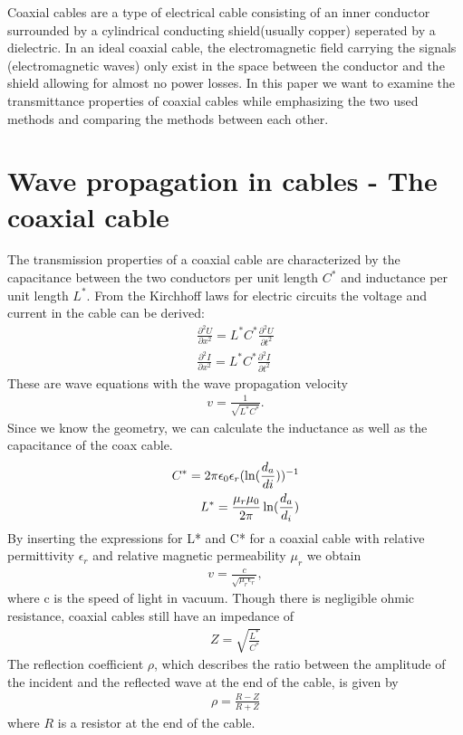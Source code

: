 \documentclass[a4paper,10pt,twocolumn]{article}
\begin{document}
    Coaxial cables are a type of electrical cable consisting of an inner conductor surrounded by a cylindrical conducting shield(usually copper) seperated by a dielectric. 
    In an ideal coaxial cable, the electromagnetic field carrying the signals (electromagnetic waves) only exist in the space between the conductor and the shield allowing for almost no power losses.
    In this paper we want to examine the transmittance properties of coaxial cables while emphasizing the two used methods and comparing the methods between each other.
    
    \section{Wave propagation in cables - The coaxial cable}
    The transmission properties of a coaxial cable are characterized by the capacitance between the two conductors per unit length $C^*$ and inductance per unit length $L^*$.
    From the Kirchhoff laws for electric circuits the voltage and current in the cable can be derived:
    \begin{align*}
        \frac{\partial^2U}{\partial x^2}=L^*C^*\frac{\partial^2U}{\partial t^2}\\
        \frac{\partial^2I}{\partial x^2}=L^*C^*\frac{\partial^2I}{\partial t^2}
    \end{align*}
    These are wave equations with the wave propagation velocity
    \begin{align}
        \label{coaxial:vel}
        v = \frac{1}{\sqrt{L^*C^*}}.
    \end{align}
    Since we know the geometry, we can calculate the inductance as well as the capacitance of the coax cable.
    \begin{align}
        C^* = 2\pi\epsilon_0\epsilon_r (\ln(\frac{d_a}{di}))^{-1}\endline
        L^* = \frac{\mu_r\mu_0}{2\pi}\ln(\frac{d_a}{d_i})
        \end{align}
    By inserting the expressions for L* and C* for a coaxial cable with relative permittivity $\epsilon_r$ and relative magnetic permeability $\mu_r$ we obtain
    \begin{align}
        \label{eq:vavePropagationVelocity}
        v = \frac{c}{\sqrt{\mu_r\epsilon_r}},
    \end{align}
    where c is the speed of light in vacuum.
    Though there is negligible ohmic resistance, coaxial cables still have an impedance of
    \begin{align}
        Z=\sqrt{\frac{L^*}{C^*}}
    \end{align}
    The reflection coefficient $\rho$, which describes the ratio between the amplitude of the incident and the reflected wave at the end of the cable, is given by
    \begin{align}
        \label{eq:coaxRef}
        \rho=\frac{R-Z}{R+Z}
    \end{align}
    where $R$ is a resistor at the end of the cable.
\end{document}
